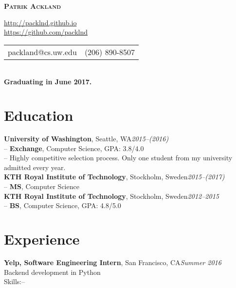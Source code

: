 \documentclass[10pt]{article}
\begin{document}

\centerline{\LARGE \textbf{\textsc{Patrik Ackland}}}

\begin{center}
  \url{http://packlnd.github.io}\\
  \vspace{0.3em}
  \url{https://github.com/packlnd}\\
  \vspace{0.3em}
  \begin{tabular}{l r}
    packland@cs.uw.edu&(206) 890-8507
  \end{tabular} \\
  \vspace{0.3em}
  \textbf{Graduating in June 2017.}
\end{center}

\section*{Education}
\vspace{0.1em}
\hline
\vspace{0.3em}
\noindent\textbf{University of Washington}, Seattle, WA\hfill\textit{2015--(2016)}\\
\indent-- \textbf{Exchange}, Computer Science, GPA: 3.8/4.0\\
\indent-- Highly competitive selection process. Only one student from my university admitted every year.\\

\noindent\textbf{KTH Royal Institute of Technology}, Stockholm, Sweden\hfill\textit{2015--(2017)}\\
\indent-- \textbf{MS}, Computer Science\\

\noindent\textbf{KTH Royal Institute of Technology}, Stockholm, Sweden\hfill\textit{2012--2015}\\
\indent-- \textbf{BS}, Computer Science, GPA: 4.8/5.0\\

\section*{Experience}
\vspace{0.1em}
\hline
\vspace{0.3em}
\noindent\textbf{Yelp, Software Engineering Intern}, San Francisco, CA\hfill\textit{Summer 2016}\\
\indent Backend development in Python \\
\indent Skills:--\\
\end{document}
